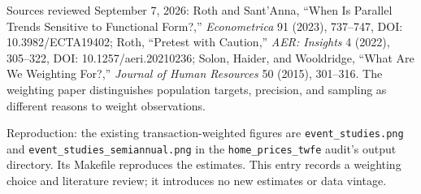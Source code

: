 {\small Sources reviewed September 7, 2026: Roth and Sant'Anna,
``When Is Parallel Trends Sensitive to Functional Form?,''
\textit{Econometrica} 91 (2023), 737--747,
DOI: 10.3982/ECTA19402; Roth, ``Pretest with Caution,''
\textit{AER: Insights} 4 (2022), 305--322, DOI: 10.1257/aeri.20210236;
Solon, Haider, and Wooldridge, ``What Are We Weighting For?,''
\textit{Journal of Human Resources} 50 (2015), 301--316.
The weighting paper distinguishes population targets, precision, and sampling
as different reasons to weight observations.}

{\small Reproduction: the existing transaction-weighted figures are
\texttt{event\_studies.png} and \texttt{event\_studies\_semiannual.png} in
the \texttt{home\_prices\_twfe} audit's output directory. Its Makefile reproduces
the estimates. This entry records a weighting choice and literature review;
it introduces no new estimates or data vintage.}
